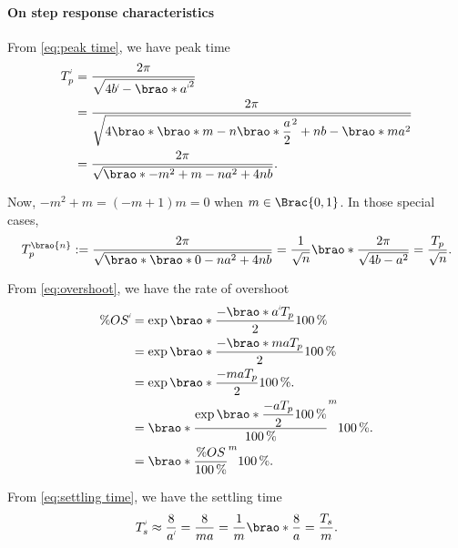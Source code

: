 \documentclass[12pt]{article}
\DeclarePairedDelimiter\brao()%
\DeclarePairedDelimiter\Brac\{\}%
\newcommand{\setprime}[2][1]{%
    {#2}^{%
        \raisebox{1pt}{%
            \scalebox{0.5}{%
                \itshape\sffamily\uppercase%
                \expandafter{%
                    \romannumeral#1%
                }%
            }%
        }
    }%
}%
\begin{document}
\begin{enumerate}[(a)]
        \paragraph{On step response characteristics}
        From \eqref{eq:peak time}, we have peak time
        \begin{equation}
            \begin{aligned}
                \setprime{T}_p &{}= \frac{2\pi}{\sqrt{4\setprime{b} - \brao*{\setprime{a}}^2}}
            \\*
                    &{}= \frac{2\pi}{\sqrt{4\brao*{\brao*{m - n}\brao*{\dfrac{a}2}^2 + nb} - \brao*{ma}^2}}
            \\*
                    &{}= \frac{2\pi}{\sqrt{\brao*{-m^2 + m - n}a^2 + 4nb}}\rlap.
            \\*
            \end{aligned}
        \end{equation}

        Now, $-m^2 + m = (-m + 1)m = 0$ when $m \in \Brac{0, 1}$. In those special cases, 
        \begin{equation}\label{eq:peak time varying n}
            T_p^{\brao{n}} := \frac{2\pi}{\sqrt{\brao*{\brao*{0} - n}a^2 + 4nb}} = \frac1{\sqrt{n}} \brao*{\frac{2\pi}{\sqrt{4b - a^2}}} = \frac{T_p}{\sqrt{n}}.
        \end{equation}

        From \eqref{eq:overshoot}, we have the rate of overshoot
        \begin{equation}
            \begin{aligned}
                \%\setprime{OS} &{}= \exp\brao*{\dfrac{-\brao*{\setprime{a}}T_p}{2}} \SI{100}\percent
            \\*
                     &{}= \exp\brao*{\dfrac{-\brao*{ma}T_p}{2}} \SI{100}\percent
            \\*
                     &{}= \exp\brao*{\dfrac{-ma T_p}{2}} \SI{100}\percent.
            \\*
                     &{}= \brao*{\frac{\exp\brao*{\dfrac{-a T_p}{2}}\SI{100}\percent}{\SI{100}\percent}}^m \SI{100}\percent.
            \\*
                     &{}= \brao*{\frac{\%OS}{\SI{100}\percent}}^m \SI{100}\percent.
            \\*
            \end{aligned}
        \end{equation}

        From \eqref{eq:settling time}, we have the settling time
        \begin{equation}
            \setprime{T}_s \approx \frac8{\setprime{a}} = \frac8{ma} = \frac1m\brao*{\frac8{a}} = \frac{T_s}m.
        \end{equation}


\end{enumerate}
\end{document}
